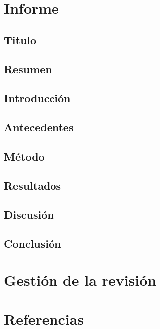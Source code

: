 \documentclass{article}
\begin{document}
\section{Informe}
\subsection{Titulo}
\subsection{Resumen}
\subsection{Introducción}
\subsection{Antecedentes}
\subsection{Método}
\subsection{Resultados}
\subsection{Discusión}
\subsection{Conclusión}
\section{Gestión de la revisión}
\section{Referencias}
\end{document}
